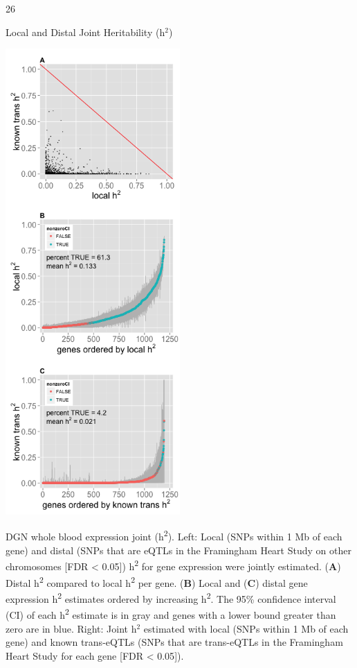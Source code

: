 \documentclass[final]{beamer}
\newcommand{\ColWidth}{26}
\begin{document}
\begin{frame}{}
\begin{textblock}{\ColWidth}
\begin{block}{Local and Distal Joint Heritability (h$^2$)}
\begin{center}
		\includegraphics[width=0.5\textwidth]{plots/Fig2.png}

	\end{center}
 		{\tiny DGN whole blood expression joint (h\textsuperscript{2}). Left: Local (SNPs within 1 Mb of each gene) and distal
 (SNPs that are eQTLs in the Framingham Heart Study on other chromosomes
 {[}FDR \textless{} 0.05{]}) h\textsuperscript{2} for gene expression
 were jointly estimated. (\textbf{A}) Distal h\textsuperscript{2}
 compared to local h\textsuperscript{2} per gene. (\textbf{B}) Local and
 (\textbf{C}) distal gene expression h\textsuperscript{2} estimates
 ordered by increasing h\textsuperscript{2}. The 95\% confidence interval
 (CI) of each h\textsuperscript{2} estimate is in gray and genes with a
 lower bound greater than zero are in blue. Right: Joint h$^2$ estimated with local (SNPs within 1 Mb
 of each gene) and known trans-eQTLs (SNPs that are trans-eQTLs in the
 Framingham Heart Study for each gene {[}FDR \textless{} 0.05{]}).\\}
\end{block}




\end{textblock}
\end{frame}
\end{document}
